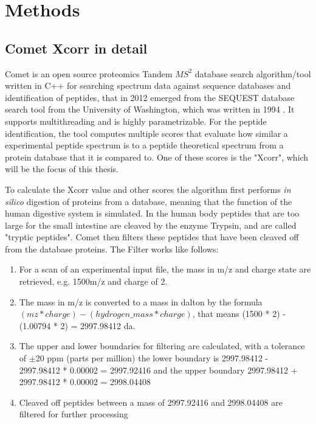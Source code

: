 \documentclass[11pt]{article}
\begin{document}
\newpage

\section{Methods}
\subsection{Comet Xcorr in detail}
Comet is an open source proteomics Tandem \(MS^2\) database search algorithm/tool written in C++ for searching spectrum data against sequence databases and identification of peptides, that in 2012 emerged from the SEQUEST database search tool from the University of Washington, which was written in 1994 \cite{comet-first-paper, comet-search-tool}. It supports multithreading and is highly parametrizable. For the peptide identification, the tool computes multiple scores that evaluate how similar a experimental peptide spectrum is to a peptide theoretical spectrum from a protein database that it is compared to. One of these scores is the "Xcorr", which will be the focus of this thesis. 

To calculate the Xcorr value and other scores the algorithm first performs \textit{in silico} digestion of proteins from a database, meaning that the function of the human digestive system is simulated. In the human body peptides that are too large for the small intestine are cleaved by the enzyme Trypsin, and are called "tryptic peptides". Comet then filters these peptides that have been cleaved off from the database proteins. The Filter works like follows:
\begin{enumerate}
    \item For a scan of an experimental input file, the mass in m/z and charge state are retrieved, e.g. 1500m/z and charge of 2.
    \item The mass in m/z is converted to a mass in dalton by the formula \begin{math}(mz * charge) - (hydrogen\_mass * charge)\end{math}, that means (1500 * 2) - (1.00794 * 2) = 2997.98412 da.
    \item The upper and lower boundaries for filtering are calculated, with a tolerance of $\pm$20 ppm (parts per million) the lower boundary is 2997.98412 - 2997.98412 * 0.00002 = 2997.92416 and the upper boundary 2997.98412 + 2997.98412 * 0.00002 = 2998.04408
    \item Cleaved off peptides between a mass of 2997.92416 and 2998.04408 are filtered for further processing
\end{enumerate}
\end{document}
